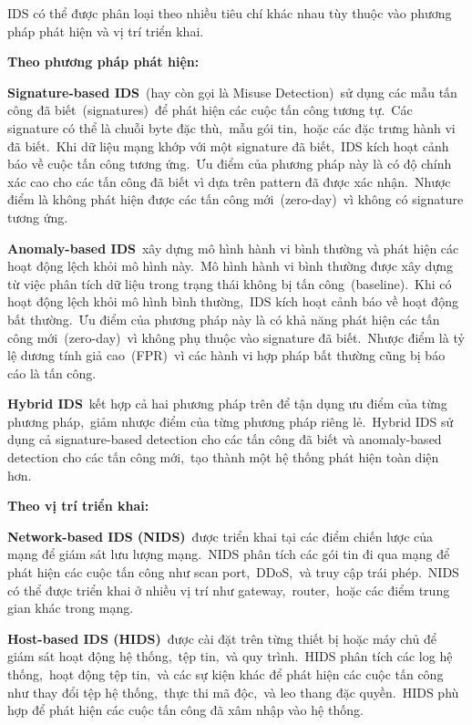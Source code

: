 IDS có thể được phân loại theo nhiều tiêu chí khác nhau tùy thuộc vào phương pháp phát hiện và vị trí triển khai.

\textbf{Theo phương pháp phát hiện:}

\textbf{Signature-based IDS}~(hay còn gọi là Misuse Detection)~sử dụng các mẫu tấn công đã biết~(signatures)~để phát hiện các cuộc tấn công tương tự.~Các signature có thể là chuỗi byte đặc thù,~mẫu gói tin,~hoặc các đặc trưng hành vi đã biết.~Khi dữ liệu mạng khớp với một signature đã biết,~IDS kích hoạt cảnh báo về cuộc tấn công tương ứng.~Ưu điểm của phương pháp này là có độ chính xác cao cho các tấn công đã biết vì dựa trên pattern đã được xác nhận.~Nhược điểm là không phát hiện được các tấn công mới~(zero-day)~vì không có signature tương ứng.

\textbf{Anomaly-based IDS}~xây dựng mô hình hành vi bình thường và phát hiện các hoạt động lệch khỏi mô hình này.~Mô hình hành vi bình thường được xây dựng từ việc phân tích dữ liệu trong trạng thái không bị tấn công~(baseline).~Khi có hoạt động lệch khỏi mô hình bình thường,~IDS kích hoạt cảnh báo về hoạt động bất thường.~Ưu điểm của phương pháp này là có khả năng phát hiện các tấn công mới~(zero-day)~vì không phụ thuộc vào signature đã biết.~Nhược điểm là tỷ lệ dương tính giả cao~(FPR)~vì các hành vi hợp pháp bất thường cũng bị báo cáo là tấn công.

\textbf{Hybrid IDS}~kết hợp cả hai phương pháp trên để tận dụng ưu điểm của từng phương pháp,~giảm nhược điểm của từng phương pháp riêng lẻ.~Hybrid IDS sử dụng cả signature-based detection cho các tấn công đã biết và anomaly-based detection cho các tấn công mới,~tạo thành một hệ thống phát hiện toàn diện hơn.

\textbf{Theo vị trí triển khai:}

\textbf{Network-based IDS (NIDS)}~được triển khai tại các điểm chiến lược của mạng để giám sát lưu lượng mạng.~NIDS phân tích các gói tin đi qua mạng để phát hiện các cuộc tấn công như scan port,~DDoS,~và truy cập trái phép.~NIDS có thể được triển khai ở nhiều vị trí như gateway,~router,~hoặc các điểm trung gian khác trong mạng.

\textbf{Host-based IDS (HIDS)}~được cài đặt trên từng thiết bị hoặc máy chủ để giám sát hoạt động hệ thống,~tệp tin,~và quy trình.~HIDS phân tích các log hệ thống,~hoạt động tệp tin,~và các sự kiện khác để phát hiện các cuộc tấn công như thay đổi tệp hệ thống,~thực thi mã độc,~và leo thang đặc quyền.~HIDS phù hợp để phát hiện các cuộc tấn công đã xâm nhập vào hệ thống.

